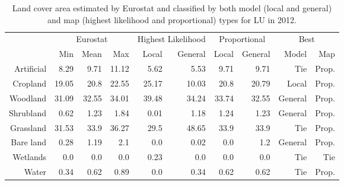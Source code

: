 \begin{table}[H]
\centering
\caption{Land cover area estimated by Eurostat and classified by both model (local and general) and map (highest likelihood and proportional) types for LU in 2012.}

\begin{tabular}{r|rrr|rr|rr|rr}
\toprule
{} & \multicolumn{3}{|c}{Eurostat} & \multicolumn{2}{|c}{Highest Likelihood} & \multicolumn{2}{|c}{Proportional} & \multicolumn{2}{|c}{Best} \\
{} &      Min &   Mean &    Max &              Local & General &        Local & General &    Model &    Map \\
\midrule
Artificial &     8.29 &   9.71 &  11.12 &               5.62 &    5.53 &         9.71 &    9.71 &      Tie &  Prop. \\
Cropland   &    19.05 &   20.8 &  22.55 &              25.17 &   10.03 &         20.8 &   20.79 &    Local &  Prop. \\
Woodland   &    31.09 &  32.55 &  34.01 &              39.48 &   34.24 &        33.74 &   32.55 &  General &  Prop. \\
Shrubland  &     0.62 &   1.23 &   1.84 &               0.01 &    1.18 &         1.24 &    1.23 &  General &  Prop. \\
Grassland  &    31.53 &   33.9 &  36.27 &               29.5 &   48.65 &         33.9 &    33.9 &      Tie &  Prop. \\
Bare land  &     0.28 &   1.19 &    2.1 &                0.0 &    0.02 &          0.0 &     1.2 &  General &  Prop. \\
Wetlands   &      0.0 &    0.0 &    0.0 &               0.23 &     0.0 &          0.0 &     0.0 &      Tie &    Tie \\
Water      &     0.34 &   0.62 &   0.89 &                0.0 &    0.34 &         0.62 &    0.62 &      Tie &  Prop. \\
\bottomrule
\end{tabular}
\end{table}

